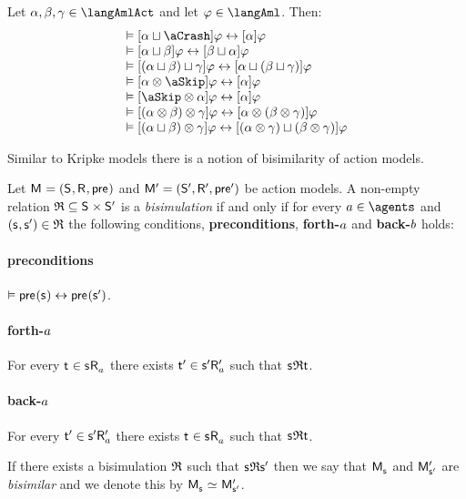 \begin{proposition}
Let $\alpha, \beta, \gamma \in \langAmlAct$ and let $\phi \in \langAml$. Then:
$$
\begin{array}{l}
    \entails \actionA{\alpha \choice \aCrash} \phi \iff \actionA{\alpha} \phi\\
    \entails \actionA{\alpha \choice \beta} \phi \iff \actionA{\beta \choice \alpha} \phi\\
    \entails \actionA{(\alpha \choice \beta) \choice \gamma} \phi \iff \actionA{\alpha \choice (\beta \choice \gamma)} \phi\\
    \entails \actionA{\alpha \compose \aSkip} \phi \iff \actionA{\alpha} \phi\\
    \entails \actionA{\aSkip \compose \alpha} \phi \iff \actionA{\alpha} \phi\\
    \entails \actionA{(\alpha \compose \beta) \compose \gamma} \phi \iff \actionA{\alpha \compose (\beta \compose \gamma)} \phi\\
    \entails \actionA{(\alpha \choice \beta) \compose \gamma} \phi \iff \actionA{(\alpha \compose \gamma) \choice (\beta \compose \gamma)} \phi
\end{array}
$$
\end{proposition}

Similar to Kripke models there is a notion of bisimilarity of action models.

\begin{definition}
Let $\aModelAndTuple$ and $\aModelAndTupleP$ be action models.
A non-empty relation $\bisimulation \subseteq \aStates \times \aStatesP$ is a {\em bisimulation} if and only if for every $\agentA \in \agents$ and $(\aStateS, \aStateSP) \in \bisimulation$ the following conditions, {\bf preconditions}, {\bf forth-$a$} and {\bf back-$b$} holds:

\paragraph{preconditions}
$\entails \aPrecondition(\aStateS) \iff \aPrecondition(\aStateSP)$.

\paragraph{forth-$a$}
For every $\aStateT \in \aSuccessorsA{\aStateS}$ there exists ${\mathsf{{t}}^{\prime}} \in {{\mathsf{{s}}^{\prime}}} {\mathsf{R}^{\prime}_{a}}$ such that $\aStateS \bisimulation \aStateT$.

\paragraph{back-$a$}
For every ${\mathsf{{t}}^{\prime}} \in {{\mathsf{{s}}^{\prime}}} {\mathsf{R}^{\prime}_{a}}$ there exists $\aStateT \in \aSuccessorsA{\aStateS}$ such that $\aStateS \bisimulation \aStateT$.

If there exists a bisimulation $\mathfrak{R}$ such that $\aStateS \bisimulation \aStateSP$ then we say that $\aPModel{\aStateS}$ and ${\mathsf{M}^{\prime}_{{\mathsf{{s}}^{\prime}}}}$ are {\em bisimilar} and we denote this by $\aPModel{\aStateS} \bisimilar \aPModelP{\aStateSP}$.
\end{definition}

